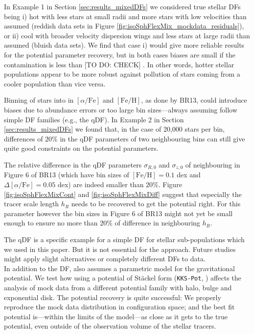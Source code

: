 In Example 1 in Section \ref{sec:results_mixedDFs} we considered true stellar DFs being i) hot with less stars at small radii and more stars with low velocities than assumed (reddish data sets in Figure \ref{fig:isoSphFlexMix_mockdata_residuals}), or ii) cool with broader velocity dispersion wings and less stars at large radii than assumed (bluish data sets).  We find that case i) would give more reliable results for the potential parameter recovery, but in both cases biases are small if the contamination is less than [TO DO: CHECK] . In other words, hotter stellar populations appear to be more robust against pollution of stars coming from a cooler population than vice versa. 

Binning of stars into \MAPs{} in $[\alpha/\mathrm{Fe}]$ and $[\mathrm{Fe}/\mathrm{H}]$, as done by BR13, could introduce biases due to abundance errors or too large bin sizes---always assuming \MAPs{} follow simple DF families (e.g., the qDF). In Example 2 in Section \ref{sec:results_mixedDFs} we found that, in the case of 20,000 stars per bin, differences of $20\%$ in the qDF parameters of two neighbouring bins can still give quite good constraints on the potential parameters.

The relative difference in the qDF parameters $\sigma_{R,0}$ and $\sigma_{z,0}$ of neighbouring \MAPs{} in Figure 6 of BR13 (which have bin sizes of $[\mathrm{Fe}/\mathrm{H}] = 0.1$ dex and $\Delta [\alpha/\mathrm{Fe}] = 0.05$ dex) are indeed smaller than $20\%$. Figure \ref{fig:isoSphFlexMixCont} and \ref{fig:isoSphFlexMixDiff} suggest that especially the tracer scale length $h_R$ needs to be recovered to get the potential right. For this parameter however the bin sizes in Figure 6 of BR13 might not yet be small enough to ensure no more than $20\%$ of difference in neighbouring $h_R$.

The qDF is a specific example for a simple DF for stellar sub-populations which we used in this paper. But it is not essential for the \RM{} approach. Future studies might apply slight alternatives or completely different DFs to data.\\


 In addition to the DF, \RM{} also assumes a parametric model for the gravitational potential. We test how using a potential of St\"{a}ckel form (\texttt{KKS-Pot}, \citealt{1994AA...287...43B}) affects the \RM{} analysis of mock data from a different potential family with halo, bulge and exponential disk. The potential recovery is quite successful: We properly reproduce the mock data distribution in configuration space; and the best fit potential is---within the limits of the model---as close as it gets to the true potential, even outside of the observation volume of the stellar tracers. 

